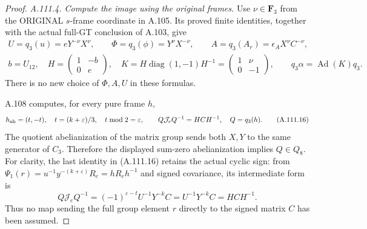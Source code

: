 \begin{proof}
\emph{A.111.4. Compute the image using the original frames.}
Use \(\nu\in\mathbf F_3\) from the ORIGINAL \(s\)-frame
coordinate in A.105. Its proved finite identities, together with
the actual full-GT conclusion of A.103, give
\[
 \begin{gathered}
 U=q_3(u)=eY^{-\nu}X^{\nu},\qquad
 \Phi=q_3(\phi)=Y^{\nu}X^{-\nu},\qquad
 A=q_3(A_r)=\epsilon_A X^{\nu}C^{-\nu},\\
 b=U_{12},\quad
 H=\begin{pmatrix}1&-b\\0&e\end{pmatrix},\quad
 K=H\operatorname{diag}(1,-1)H^{-1}
        =\begin{pmatrix}1&\nu\\0&-1\end{pmatrix},\qquad
 q_3\alpha=\operatorname{Ad}(K)q_3.
 \end{gathered}
\tag{A.111.15}
\]
There is no new choice of \(\Phi,A,U\) in these formulas.

A.108 computes, for every pure frame \(h\),
\[
 h_{\rm ab}=(t,-t),\quad t=(k+\varepsilon)/3,
 \quad t\bmod2=\varepsilon,
 \qquad Q\mathcal J_eQ^{-1}=HCH^{-1},\quad Q=q_3(h).
\tag{A.111.16}
\]
The quotient abelianization of the matrix group sends both
\(X,Y\) to the same generator of \(C_3\). Therefore the
displayed sum-zero abelianization implies \(Q\in Q_8\).
For clarity, the last identity in (A.111.16) retains the actual
cyclic sign: from
\(\Psi_1(r)=u^{-1}y^{-(k+\varepsilon)}R_e=hR_eh^{-1}\)
and signed covariance, its intermediate form is
\[
 Q\mathcal J_eQ^{-1}
   =(-1)^{\varepsilon-t}U^{-1}Y^{-k}C
   =U^{-1}Y^{-k}C=HCH^{-1}.
\]
Thus no map sending the full group element \(r\) directly to
the signed matrix \(C\) has been assumed.


\end{proof}
